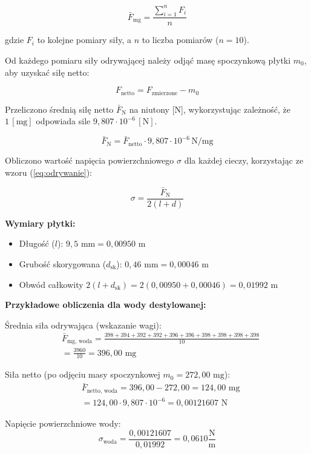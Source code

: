\documentclass[a4paper,12pt]{article}
\begin{document}
$$
    \bar{F}_{\text{mg}} = \frac{\sum_{i=1}^{n} F_i}{n}
$$

gdzie $F_i$ to kolejne pomiary siły, a $n$ to liczba pomiarów ($n=10$).

Od każdego pomiaru siły odrywającej należy odjąć masę spoczynkową płytki $m_0$, aby uzyskać siłę netto:

$$
    F_{\text{netto}} = F_{\text{zmierzone}} - m_0
$$

Przeliczono średnią siłę netto $\bar{F}_{\text{N}}$ na niutony [N], wykorzystując zależność, że $1 \, [\text{mg}]$ odpowiada sile $9{,}807 \cdot 10^{-6} \, [\text{N}]$.

$$
    \bar{F}_{\text{N}} = \bar{F}_{\text{netto}} \cdot 9{,}807 \cdot 10^{-6} \, \text{N/mg}
$$

Obliczono wartość napięcia powierzchniowego $\sigma$ dla każdej cieczy, korzystając ze wzoru (\ref{eq:odrywanie}):

$$
    \sigma = \frac{\bar{F}_{\text{N}}}{2(l+d)}
$$

\noindent\textbf{Wymiary płytki:}
\begin{itemize}
    \item Długość ($l$): $9{,}5 \text{ mm} = 0{,}00950 \text{ m}$
    \item Grubość skorygowana ($d_{\text{sk}}$): $0{,}46 \text{ mm} = 0{,}00046 \text{ m}$
    \item Obwód całkowity $2(l+d_{\text{sk}}) = 2(0{,}00950 + 0{,}00046) = 0{,}01992 \text{ m}$
\end{itemize}

\noindent\textbf{Przykładowe obliczenia dla wody destylowanej:}

Średnia siła odrywająca (wskazanie wagi):
\begin{align*}
     & \bar{F}_{\text{mg, woda}} = \frac{398+394+392+392+396+396+398+398+398+398}{10} \\
     & = \frac{3960}{10} = 396{,}00 \text{ mg}
\end{align*}

Siła netto (po odjęciu masy spoczynkowej $m_0 = 272{,}00 \text{ mg}$):
\begin{align*}
     & \bar{F}_{\text{netto, woda}} = 396{,}00 - 272{,}00 = 124{,}00 \text{ mg} \\
     & = 124{,}00 \cdot 9{,}807 \cdot 10^{-6} = 0{,}00121607 \text{ N}
\end{align*}

Napięcie powierzchniowe wody:
$$
    \sigma_{\text{woda}} = \frac{0{,}00121607}{0{,}01992} = 0{,}0610 \frac{\text{N}}{\text{m}}
$$
\end{document}
